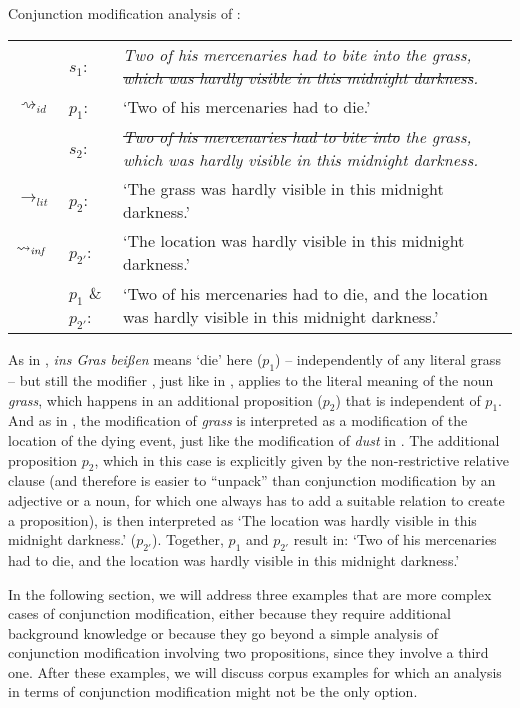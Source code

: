 \documentclass[output=paper]{langsci/langscibook}
\begin{document}
\ea \label{analysis hardly visible grass} 
Conjunction modification analysis of :\smallskip\\
\begin{tabularx}{\linewidth}[t]{@{}llQ@{}}
 & 	$s_{1}$: &  \textit{Two of his mercenaries had to bite into the grass, \sout{which was hardly visible in this midnight darkness}.} \\
$\rightsquigarrow_{id}$		&	$p_{1}$: & `Two of his mercenaries had to die.' \medskip\\
							& 	$s_{2}$: &  \textit{\sout{Two of his mercenaries had to bite into} the grass, which was hardly visible in this midnight darkness.} \\
$\rightarrow_{lit}$			&	$p_{2}$: & `The grass was hardly visible in this midnight darkness.' \\
$\rightsquigarrow_{\text{\itshape inf}}$	&	$p_{2'}$: & `The location was hardly visible in this midnight darkness.' \medskip\\
                            &	$p_{1}$ \& $p_{2'}$: & `Two of his mercenaries had to die, and the location was hardly visible in this midnight darkness.'\\ 
\end{tabularx}
\z

\noindent As in , \textit{ins Gras beißen} means `die' here ($p_{1}$) -- independently of any literal grass -- but still the modifier \underline{}, just like \underline{} in , applies to the literal meaning of the noun \textit{grass}, which happens in an additional proposition ($p_{2}$) that is independent of $p_{1}$. And as in , the modification of \textit{grass} is interpreted as a modification of the location of the dying event, just like the modification of \textit{dust} in . The additional proposition $p_{2}$, which in this case is explicitly given by the non-restrictive relative clause (and therefore is easier to ``unpack'' than conjunction modification by an adjective or a noun, for which one always has to add a suitable relation to create a proposition), is then interpreted as `The location was hardly visible in this midnight darkness.' ($p_{2'}$). Together, $p_{1}$ and $p_{2'}$ result in: `Two of his mercenaries had to die, and the location was hardly visible in this midnight darkness.' 

In the following section, we will address three examples that are more complex cases of conjunction modification, either because they require additional background knowledge or because they go beyond a simple analysis of conjunction modification involving two propositions, since they involve a third one. After these examples, we will discuss corpus examples for which an analysis in terms of conjunction modification might not be the only option.\largerpage[2]
\end{document}
